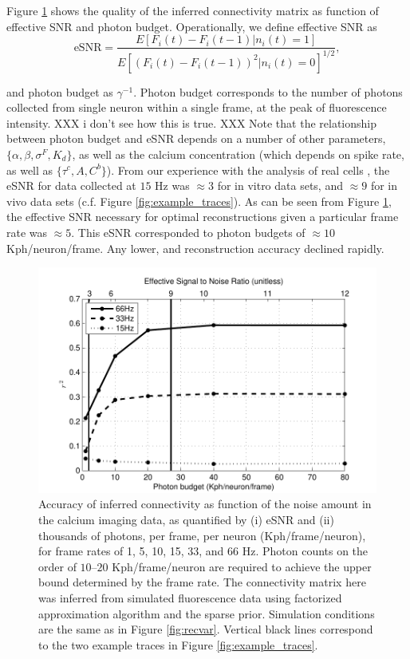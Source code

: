 \documentclass[aoas,preprint]{imsart}
\begin{document}
Figure \ref{fig:recvar-SNR} shows the quality of the inferred connectivity matrix as function of effective SNR and photon budget. Operationally, we define effective SNR as
\begin{equation}
\text{eSNR}=\frac{E[F_i(t)-F_i(t-1)|n_i(t)=1]}{E[(F_i(t)-F_i(t-1))^2|n_i(t)=0]^{1/2}},
\end{equation}

\noindent and photon budget as $\gamma^{-1}$.  Photon budget corresponds to the number of photons collected from single neuron within a single frame, at the peak of fluorescence intensity. XXX i don't see how this is true. XXX Note that the relationship between photon budget and eSNR depends on a number of other parameters, $\{\alpha,\beta,\sigma^F, K_d\}$, as well as the calcium concentration (which depends on spike rate, as well as $\{\tau^c, A, C^b\}$). From our experience with the analysis of real cells \cite{Vogelstein2009}, the eSNR for data collected at $15$ Hz was $\approx 3$ for in vitro data sets, and $\approx 9$ for in vivo data sets (c.f. Figure \ref{fig:example_traces}). As can be seen from Figure \ref{fig:recvar-SNR}, the effective SNR necessary for optimal reconstructions given a particular frame rate was $\approx 5$. This eSNR corresponded to photon budgets of $\approx 10$ Kph/neuron/frame. Any lower, and reconstruction accuracy declined rapidly.  

\begin{figure}[h]
\centering
\begin{minipage}[c]{0.6\hsize}
\includegraphics[width=\hsize]{../figs/FigureA6_recvar_SNRb}
\end{minipage}
\caption{Accuracy of inferred connectivity as function of the noise amount in the calcium imaging data, as quantified by (i) eSNR and (ii) thousands of photons, per frame, per neuron (Kph/frame/neuron), for frame rates of 1, 5, 10, 15, 33, and 66 Hz. Photon counts on the order of $10$--$20$ Kph/frame/neuron are required to achieve the upper bound determined by the frame rate. The connectivity matrix here was inferred from simulated fluorescence data using factorized approximation algorithm and the sparse prior. Simulation conditions are the same as in Figure \ref{fig:recvar}.  Vertical black lines correspond to the two example traces in Figure \ref{fig:example_traces}.}
\label{fig:recvar-SNR}
\end{figure}
\end{document}
